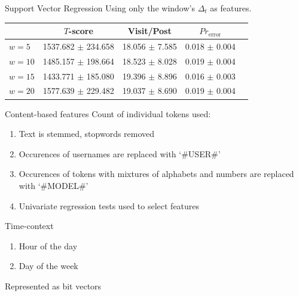 \documentclass[12pt]{../presentation}
\begin{document}
\begin{frame}{Support Vector Regression}
		Using only the window's $\Delta_t$ as features.
	\begin{center}
		\scriptsize
		\begin{tabular}{ | l | c | c | c | c |}
			\hline
						&	        $T$-score &	       		Visit/Post	  & $Pr_{\text{error}}$\\
			\hline
     $w=5 $ &	1537.682 $\pm$ 234.658	&  18.056 $\pm$ 7.585 &	0.018 $\pm$ 0.004  \\
     $w=10$ &	1485.157 $\pm$ 198.664	&  18.523 $\pm$ 8.028 &	0.019 $\pm$ 0.004  \\
     $w=15$ &	1433.771 $\pm$ 185.080	&  19.396 $\pm$ 8.896 &	0.016 $\pm$ 0.003  \\
     $w=20$ &	1577.639 $\pm$ 229.482	&  19.037 $\pm$ 8.690 &	0.019 $\pm$ 0.004  \\
			\hline
		\end{tabular}
	\end{center}
\end{frame}

\begin{frame}{Content-based features}
	Count of individual tokens used:
	\begin{enumerate}
		\item Text is stemmed, stopwords removed
		\item Occurences of usernames are replaced with `\#USER\#'
		\item Occurences of tokens with mixtures of alphabets and numbers are 
			replaced with `\#MODEL\#'
		\item Univariate regression tests used to select features
	\end{enumerate}
\end{frame}
\begin{frame}{Time-context}
	\begin{enumerate}
		\item Hour of the day
		\item Day of the week
	\end{enumerate}
	Represented as bit vectors
\end{frame}
\end{document}
